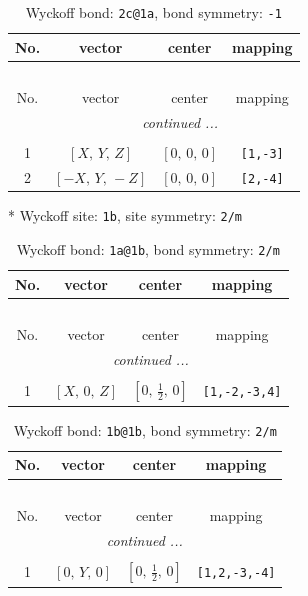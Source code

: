 \documentclass[fleqn,8pt]{jsarticle}
\begin{document}
\renewcommand{\arraystretch}{1.2}
\begin{longtable}{cccc}
\caption{Wyckoff bond: {\tt 2c@1a}, bond symmetry: {\tt -1}}
 \\
 \hline \hline
No. & vector & center & mapping \\ \hline \endfirsthead

\multicolumn{3}{l}{\tablename\ \thetable{}} \\
 \hline \hline
No. & vector & center & mapping \\ \hline \endhead

 \hline \hline
\multicolumn{3}{r}{\footnotesize\it continued ...} \\ \endfoot

 \hline \hline
\multicolumn{3}{r}{} \\ \endlastfoot

1 & $\left[ X,\, Y,\, Z \right]$ & $\left[ 0,\, 0,\, 0 \right]$ & {\tt [1,-3]} \\ \hline
2 & $\left[ - X,\, Y,\, - Z \right]$ & $\left[ 0,\, 0,\, 0 \right]$ & {\tt [2,-4]} \\
\end{longtable}
* Wyckoff site: {\tt 1b}, site symmetry: {\tt 2/m}
\renewcommand{\arraystretch}{1.2}
\begin{longtable}{cccc}
\caption{Wyckoff bond: {\tt 1a@1b}, bond symmetry: {\tt 2/m}}
 \\
 \hline \hline
No. & vector & center & mapping \\ \hline \endfirsthead

\multicolumn{3}{l}{\tablename\ \thetable{}} \\
 \hline \hline
No. & vector & center & mapping \\ \hline \endhead

 \hline \hline
\multicolumn{3}{r}{\footnotesize\it continued ...} \\ \endfoot

 \hline \hline
\multicolumn{3}{r}{} \\ \endlastfoot

1 & $\left[ X,\, 0,\, Z \right]$ & $\left[ 0,\, \frac{1}{2},\, 0 \right]$ & {\tt [1,-2,-3,4]} \\
\end{longtable}
\renewcommand{\arraystretch}{1.2}
\begin{longtable}{cccc}
\caption{Wyckoff bond: {\tt 1b@1b}, bond symmetry: {\tt 2/m}}
 \\
 \hline \hline
No. & vector & center & mapping \\ \hline \endfirsthead

\multicolumn{3}{l}{\tablename\ \thetable{}} \\
 \hline \hline
No. & vector & center & mapping \\ \hline \endhead

 \hline \hline
\multicolumn{3}{r}{\footnotesize\it continued ...} \\ \endfoot

 \hline \hline
\multicolumn{3}{r}{} \\ \endlastfoot

1 & $\left[ 0,\, Y,\, 0 \right]$ & $\left[ 0,\, \frac{1}{2},\, 0 \right]$ & {\tt [1,2,-3,-4]} \\
\end{longtable}
\end{document}
